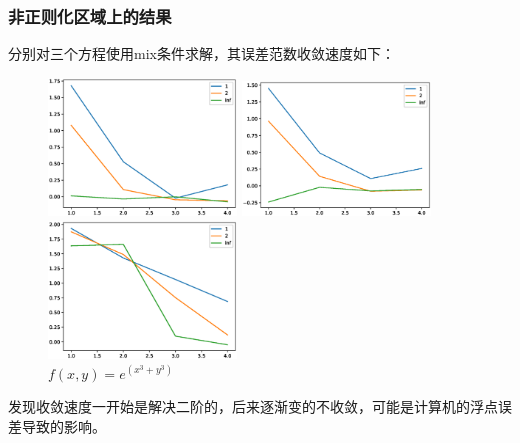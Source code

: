 \documentclass[12]{article}%
\begin{document}
\subsubsection{非正则化区域上的结果}
分别对三个方程使用mix条件求解，其误差范数收敛速度如下：
\begin{figure}[H]
    \centering
    \begin{minipage}[t]{0.3\textwidth}
    \centering
    \includegraphics[width=5cm]{../pic/fun1_irregu_error_norm.eps}
    \caption{$f(x,y)=e^(x^3+y^3)$}
    \end{minipage}
    \begin{minipage}[t]{0.3\textwidth}
    \centering
    \includegraphics[width=5cm]{../pic/fun2_irregu_error_norm.eps}
    \caption{$f(x,y)=sin(3x+3y)$}
    \end{minipage}
    \begin{minipage}[t]{0.3\textwidth}
    \centering
    \includegraphics[width=5cm]{../pic/fun3_irregu_error_norm.eps}
    \caption{$f(x,y)=e^(x^3+y^3)$}
    \end{minipage}
\end{figure}
发现收敛速度一开始是解决二阶的，后来逐渐变的不收敛，可能是计算机的浮点误差导致的影响。
\end{document}
